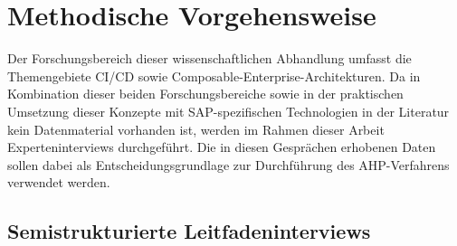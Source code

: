 \section{Methodische Vorgehensweise}

Der Forschungsbereich dieser wissenschaftlichen Abhandlung umfasst die Themengebiete CI/CD sowie Composable-Enterprise-Architekturen. Da in Kombination dieser beiden Forschungsbereiche sowie in der praktischen Umsetzung dieser Konzepte mit SAP-spezifischen Technologien in der Literatur kein Datenmaterial vorhanden ist, werden im Rahmen dieser Arbeit Experteninterviews durchgeführt. Die in diesen Gesprächen erhobenen Daten sollen dabei als Entscheidungsgrundlage zur Durchführung des AHP-Verfahrens verwendet werden.
\subsection{Semistrukturierte Leitfadeninterviews}

